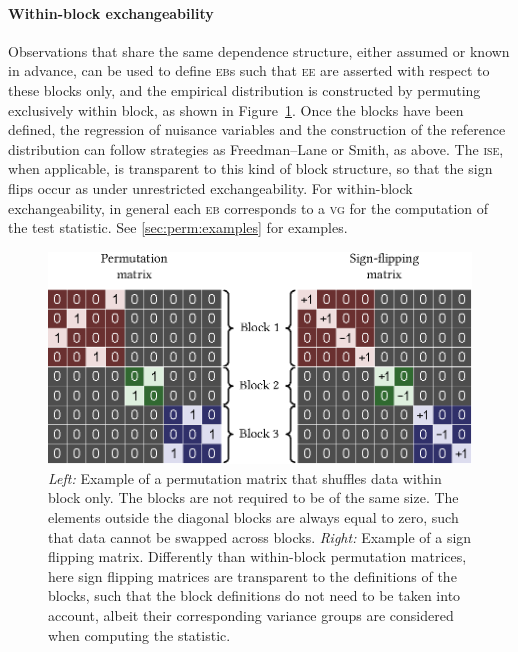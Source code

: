 \paragraph{Within-block exchangeability}

Observations that share the same dependence structure, either assumed or known in advance, can be used to define \textsc{eb}s such that \textsc{ee} are asserted with respect to these blocks only, and the empirical distribution is constructed by permuting exclusively within block, as shown in Figure~\ref{fig:within-block}. Once the blocks have been defined, the regression of nuisance variables and the construction of the reference distribution can follow strategies as Freedman--Lane or Smith, as above. The \textsc{ise}, when applicable, is transparent to this kind of block structure, so that the sign flips occur as under unrestricted exchangeability. For within-block exchangeability, in general each \textsc{eb} corresponds to a \textsc{vg} for the computation of the test statistic. See \ref{sec:perm:examples} for examples.

\begin{figure}[!p]
\centering
\includegraphics{images/within-block.eps}
\caption[Example of permutation and sign flipping matrix for within-block exchangeability]{\emph{Left:} Example of a permutation matrix that shuffles data within block only. The blocks are not required to be of the same size. The elements outside the diagonal blocks are always equal to zero, such that data cannot be swapped across blocks. \emph{Right:} Example of a sign flipping matrix. Differently than within-block permutation matrices, here sign flipping matrices are transparent to the definitions of the blocks, such that the block definitions do not need to be taken into account, albeit their corresponding variance groups are considered when computing the statistic.}
\label{fig:within-block}
\end{figure}

